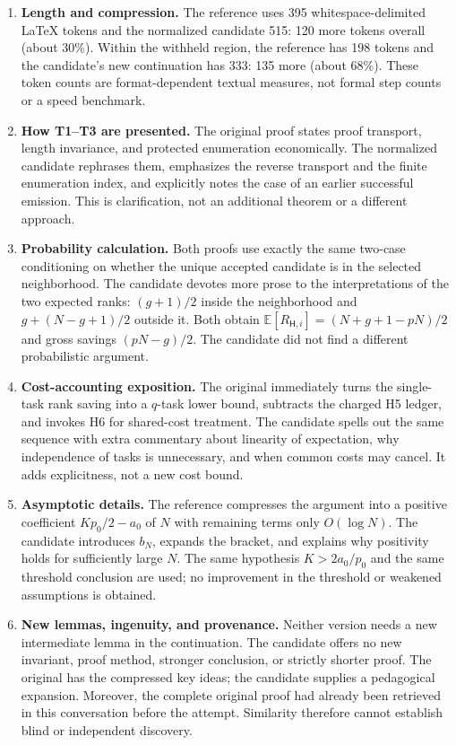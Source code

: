 \documentclass[11pt,letterpaper]{article}
\begin{document}
\begin{enumerate}[label=\textbf{D\arabic*.}, leftmargin=2.2em, itemsep=4pt]
\item \textbf{Length and compression.} The reference uses 395 whitespace-delimited
LaTeX tokens and the normalized candidate 515: 120 more tokens overall (about 30\%).
Within the withheld region, the reference has 198 tokens and the candidate's
new continuation has 333: 135 more (about 68\%). These token counts are
format-dependent textual measures, not formal step counts or a speed benchmark.

\item \textbf{How T1--T3 are presented.} The original proof states proof transport,
length invariance, and protected enumeration economically. The normalized candidate
rephrases them, emphasizes the reverse transport and the finite enumeration index,
and explicitly notes the case of an earlier successful emission. This is clarification,
not an additional theorem or a different approach.

\item \textbf{Probability calculation.} Both proofs use exactly the same two-case
conditioning on whether the unique accepted candidate is in the selected neighborhood.
The candidate devotes more prose to the interpretations of the two expected ranks:
$(g+1)/2$ inside the neighborhood and $g+(N-g+1)/2$ outside it. Both obtain
$\mathbb E[R_{\mathsf H,i}]=(N+g+1-pN)/2$ and gross savings $(pN-g)/2$.
The candidate did not find a different probabilistic argument.

\item \textbf{Cost-accounting exposition.} The original immediately turns the
single-task rank saving into a $q$-task lower bound, subtracts the charged H5 ledger,
and invokes H6 for shared-cost treatment. The candidate spells out the same sequence
with extra commentary about linearity of expectation, why independence of tasks is
unnecessary, and when common costs may cancel. It adds explicitness, not a new cost bound.

\item \textbf{Asymptotic details.} The reference compresses the argument into a
positive coefficient $Kp_0/2-a_0$ of $N$ with remaining terms only $O(\log N)$.
The candidate introduces $b_N$, expands the bracket, and explains why positivity
holds for sufficiently large $N$. The same hypothesis $K>2a_0/p_0$ and the same
threshold conclusion are used; no improvement in the threshold or weakened
assumptions is obtained.

\item \textbf{New lemmas, ingenuity, and provenance.} Neither version needs a new
intermediate lemma in the continuation. The candidate offers no new invariant,
proof method, stronger conclusion, or strictly shorter proof. The original has the
compressed key ideas; the candidate supplies a pedagogical expansion. Moreover,
the complete original proof had already been retrieved in this conversation before
the attempt. Similarity therefore cannot establish blind or independent discovery.
\end{enumerate}
\end{document}
